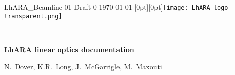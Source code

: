\graphicspath{ {00-Top-matter/Figures/} }
\thispagestyle{empty}

\noindent LhARA\_Beamline-01 Draft 0 \hfill \today{} \hfill  \raisebox{-3.25mm}[0pt][0pt]{\texttt{[image: LhARA-logo-transparent.png]}}

\vspace{-0.25cm}
\noindent{\color{DarkYellow} \rule[0mm]{\textwidth}{0.43pt}}\\
\vspace{-0.50cm}
\begin{center}
  {\bf\LARGE\color{DarkBlue}
    LhARA linear optics documentation
  }
\end{center}
\vspace{-0.4cm}
\begin{center}
  N.~Dover, K.R.~Long, J.~McGarrigle, M.~Maxouti
\end{center}
\vspace{-0.2cm}
